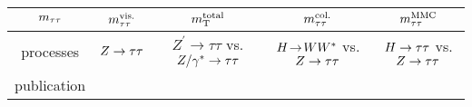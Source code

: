 \begin{tabular}{c||c|c|c|c}
  $m_{\tau\tau}$  & $m_{\tau\tau}^\text{vis.}$              & $m_{\text{T}}^\text{total}$                                       & $m_{\tau\tau}^\text{col.}$               & $m_{\tau\tau}^\text{MMC}$                   \\
  \hline
  processes   & $Z\rightarrow\tau\tau$           & $Z^\prime\rightarrow\tau\tau$ vs. $Z/\gamma^\ast \rightarrow \tau\tau$ & $H \!\rightarrow\! WW^\ast$ vs. $Z\rightarrow\tau\tau$ & $H\rightarrow\tau\tau$ vs. $Z\rightarrow\tau\tau$ \\
  publication & \cite{PERF-2013-06}  & \cite{EXOT-2012-03}                            & \cite{HIGG-2013-13}   & \cite{HIGG-2013-32}       \\
\end{tabular}
